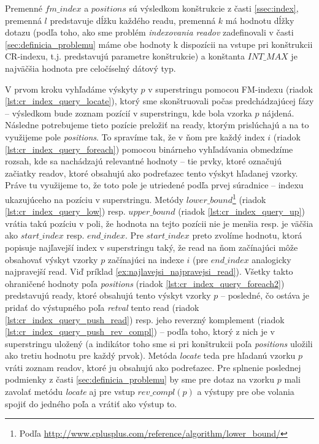 Premenné $fm\_index$ a $positions$ sú výsledkom konštrukcie z časti \ref{ssec:index}, premenná $l$ predstavuje dĺžku každého readu, premenná $k$ má hodnotu dĺžky dotazu (podľa toho, ako sme problém \emph{indexovania readov} zadefinovali v časti \ref{sec:definicia_problemu} máme obe hodnoty k dispozícii na vstupe pri konštrukcii CR-indexu, t.j. predstavujú parametre konštrukcie) a konštanta $INT\_MAX$ je najväčšia hodnota pre celočíselný dátový typ.

V prvom kroku vyhľadáme výskyty $p$ v superstringu pomocou FM-indexu (riadok \ref{lst:cr_index_query_locate}), ktorý sme skonštruovali počas predchádzajúcej fázy -- výsledkom bude zoznam pozícií v superstringu, kde bola vzorka $p$ nájdená. Následne potrebujeme tieto pozície preložiť na ready, ktorým prislúchajú a na to využijeme pole \emph{positions}. To spravíme tak, že v ňom pre každý index $i$ (riadok \ref{lst:cr_index_query_foreach}) pomocou binárneho vyhľadávania obmedzíme rozsah, kde sa nachádzajú relevantné hodnoty -- tie prvky, ktoré označujú začiatky readov, ktoré obsahujú ako podreťazec tento výskyt hľadanej vzorky. Práve tu využijeme to, že toto pole je utriedené podľa prvej súradnice -- indexu ukazujúceho na pozíciu v superstringu. Metódy $lower\_bound$\footnote{Podľa \url{http://www.cplusplus.com/reference/algorithm/lower_bound/}} (riadok \ref{lst:cr_index_query_low}) resp. $upper\_bound$ (riadok \ref{lst:cr_index_query_up}) vrátia takú pozíciu v poli, že hodnota na tejto pozícii nie je menšia resp. je väčšia ako $start\_index$ resp. $end\_index$. Pre $start\_index$ preto zvolíme hodnotu, ktorá popisuje najľavejší index v superstringu taký, že read na ňom začínajúci môže obsahovať výskyt vzorky $p$ začínajúci na indexe $i$ (pre $end\_index$ analogicky najpravejší read. Viď príklad \ref{ex:najlavejsi_najpravejsi_read}). Všetky takto ohraničené hodnoty poľa \emph{positions} (riadok \ref{lst:cr_index_query_foreach2}) predstavujú ready, ktoré obsahujú tento výskyt vzorky $p$ -- posledné, čo ostáva je pridať do výstupného poľa \emph{retval} tento read (riadok \ref{lst:cr_index_query_push_read}) resp. jeho reverzný komplement (riadok \ref{lst:cr_index_query_push_rev_compl}) -- podľa toho, ktorý z nich je v superstringu uložený (a indikátor toho sme si pri konštrukcii poľa \emph{positions} uložili ako tretiu hodnotu pre každý prvok). Metóda \emph{locate} teda pre hľadanú vzorku $p$ vráti zoznam readov, ktoré ju obsahujú ako podreťazec. Pre splnenie poslednej podmienky z časti \ref{sec:definicia_problemu} by sme pre dotaz na vzorku $p$ mali zavolať metódu \emph{locate} aj pre vstup $rev\_compl(p)$ a výstupy pre obe volania spojiť do jedného poľa a vrátiť ako výstup to.

